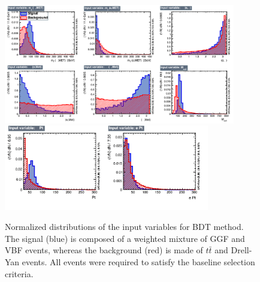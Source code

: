 \begin{figure}
\begin{center}
\includegraphics[width=0.9\textwidth]{plots_and_figures/chapter5/variables_id_c1.pdf}\\
\includegraphics[width=0.8\textwidth]{plots_and_figures/chapter5/variables_id_c2.png}\\
\end{center}
\caption{ Normalized distributions of the input variables for BDT method. The signal (blue) is composed of a weighted mixture of GGF and VBF events, whereas the background (red) is made of $t\bar{t}$ and Drell-Yan events. All events were required to satisfy the baseline selection criteria.}
\label{fig:bdt_inp_var}
\end{figure}

